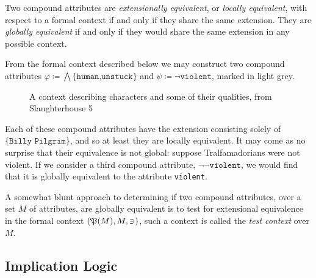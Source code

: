 \begin{definition}
	\label{definition:equivalence-compound-attributes}

	Two compound attributes are \textit{extensionally equivalent}, or \textit{locally
		equivalent}, with respect to a formal context if and only if they share the
	same extension. They are \textit{globally equivalent} if and only if they
	would share the same extension in any possible context.
\end{definition}

\begin{example}
	From the formal context described below we may construct two compound attributes
	$\varphi \coloneqq \bigwedge \{\texttt{human,unstuck}\}$ and $\psi \coloneqq \neg
		\texttt{violent}$, marked in light grey.
	\begin{figure}[H]
		\centering
		\small
		\begin{cxt}
			\label{cxt:slaughterhouse5} 
			   
			 \atr{\textcolor{gray!70}{$\varphi$}}\atr{\textcolor{gray!70}{$\psi$}}

			 
			 
		\end{cxt}
		\caption{A context describing characters and some of their qualities, from Slaughterhouse
			5}
		\label{figure:context-slaughterhouse5}
	\end{figure}
	Each of these compound attributes have the extension consisting solely of $\{\texttt
		{Billy Pilgrim}\}$, and so at least they are locally equivalent. It may come as
	no surprise that their equivalence is not global: suppose Tralfamadorians were
	not violent. If we consider a third compound attribute,
	$\neg \neg \texttt{violent}$, we would find that it is globally equivalent to the
	attribute \texttt{violent}.
\end{example}

A somewhat blunt approach to determining if two compound attributes, over a set $M$
of attributes, are globally equivalent is to test for extensional equivalence in
the formal context $(\mathfrak{P}({M}), M, \ni)$, such a context is called the \textit{test
	context} over $M$.

\subsection{Implication Logic}
\label{subsection:implication-logic}


